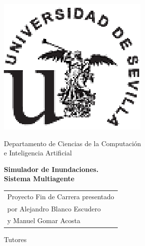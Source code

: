 \thispagestyle{empty}

{
\thispagestyle{empty}
\begin{center}
\includegraphics{figuras/titulo/logous-moderno.ps}
\end{center}
\vspace*{0cm}
\Large
\begin{center}
{\normalsize \sc
Departamento de Ciencias de la Computación \\ e Inteligencia Artificial \\}

\end{center}

\vspace{0.5cm}

\LARGE

\begin{center}
{\bf Simulador de Inundaciones. \\ Sistema Multiagente}
\end{center}

\Large

\vspace*{2cm}
\vfill

\hspace*{.5\textwidth}
\normalsize
\begin{tabular}{l}

Proyecto Fin de Carrera presentado\\
por Alejandro Blanco Escudero \\
y Manuel Gomar Acosta \\

\end{tabular} \par

\vspace*{-2.9cm}

Tutores

\vspace*{4cm}

}
